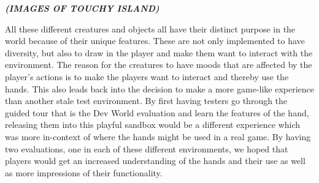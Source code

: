 \textbf{\textit{(IMAGES OF TOUCHY ISLAND)}}

All these different creatures and objects all have their distinct purpose in the world because of their unique features. These are not only implemented to have diversity, but also to draw in the player and make them want to interact with the environment. The reason for the creatures to have moods that are affected by the player's actions is to make the players want to interact and thereby use the hands. This also leads back into the decision to make a more game-like experience than another stale test environment. By first having testers go through the guided tour that is the Dev World evaluation and learn the features of the hand, releasing them into this playful sandbox would be a different experience which was more in-context of where the hands might be used in a real game. By having two evaluations, one in each of these different environments, we hoped that players would get an increased understanding of the hands and their use as well as more impressions of their functionality. 
